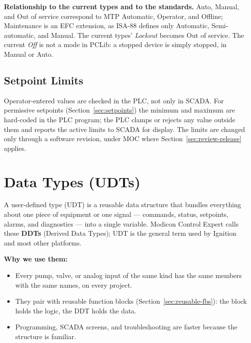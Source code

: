 \textbf{Relationship to the current types and to the standards.} Auto, Manual, and Out of service correspond to MTP Automatic, Operator, and Offline; Maintenance is an EFC extension, as ISA-88 defines only Automatic, Semi-automatic, and Manual. The current types' \emph{Lockout} becomes Out of service. The current \emph{Off} is not a mode in PCLib: a stopped device is simply stopped, in Manual or Auto.

\subsection{Setpoint Limits}\label{sec:plc-setpoint-clamp}
Operator-entered values are checked in the PLC, not only in SCADA. For permissive setpoints (Section~\ref{sec:setpoints}) the minimum and maximum are hard-coded in the PLC program; the PLC clamps or rejects any value outside them and reports the active limits to SCADA for display. The limits are changed only through a software revision, under MOC where Section~\ref{sec:review-release} applies.

\section{Data Types (UDTs)}\label{sec:udt}
A user-defined type (UDT) is a reusable data structure that bundles everything about one piece of equipment or one signal --- commands, status, setpoints, alarms, and diagnostics --- into a single variable. Modicon Control Expert calls these \textbf{DDTs} (Derived Data Types); UDT is the general term used by Ignition and most other platforms.

\textbf{Why we use them:}
\begin{itemize}[itemsep=1pt]
  \item Every pump, valve, or analog input of the same kind has the same members with the same names, on every project.
  \item They pair with reusable function blocks (Section~\ref{sec:reusable-fbs}): the block holds the logic, the DDT holds the data.
  \item Programming, SCADA screens, and troubleshooting are faster because the structure is familiar.
\end{itemize}

